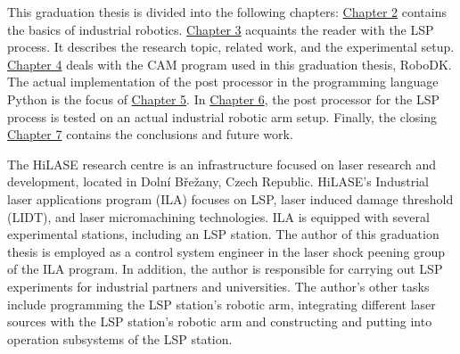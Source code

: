 This graduation thesis is divided into the following chapters: \hyperref[chap:basics]{Chapter 2} contains the basics of industrial robotics. \hyperref[chap:peening]{Chapter 3} acquaints the reader with the LSP process.  It describes the research topic, related work, and the experimental setup.  
\hyperref[chap:design]{Chapter 4} deals with the CAM program used in this graduation thesis, RoboDK. The actual implementation of the post processor in the programming language Python is the focus of \hyperref[chap:implementation]{Chapter 5}. In \hyperref[chap:testing]{Chapter 6}, the post processor for the LSP process is tested on an actual industrial robotic arm setup. Finally, the closing \hyperref[chap:discussion]{Chapter 7} contains the conclusions and future work. 

The HiLASE research centre is an infrastructure focused on laser research and development, located in Dolní Břežany, Czech Republic. HiLASE's Industrial laser applications program (ILA) focuses on LSP, laser induced damage threshold (LIDT), and laser micromachining technologies. ILA is equipped with several experimental stations, including an LSP station. The author of this graduation thesis is employed as a control system engineer in the laser shock peening group of the ILA program. In addition, the author is responsible for carrying out LSP experiments for industrial partners and universities. The author's other tasks include programming the LSP station's robotic arm, integrating different laser sources with the  LSP station's robotic arm and constructing and putting into operation subsystems of the LSP station.




